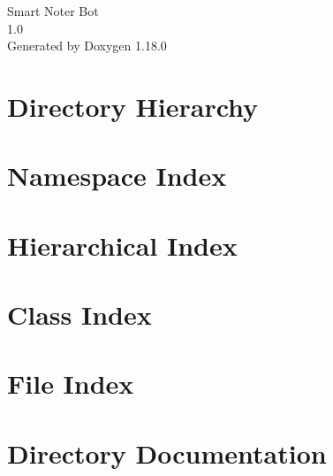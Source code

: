 \documentclass[twoside]{book}
\newcommand{\+}{\discretionary{\mbox{\scriptsize$\hookleftarrow$}}{}{}}
\newcommand{\clearemptydoublepage}{%
    \newpage{\pagestyle{empty}\cleardoublepage}%
  }
\begin{document}
  \raggedbottom
    \hypersetup{pageanchor=false,
                bookmarksnumbered=true,
                pdfencoding=unicode
               }
  \begin{titlepage}
  \vspace*{7cm}
  \begin{center}%
  {\Large Smart Noter Bot}\\
  [1ex]\large 1.\+0 \\
  \vspace*{1cm}
  {\large Generated by Doxygen 1.18.0}\\
  \end{center}
  \end{titlepage}
  \clearemptydoublepage
  \tableofcontents
  \clearemptydoublepage
  \hypersetup{pageanchor=true}

\chapter{Directory Hierarchy}

\chapter{Namespace Index}

\chapter{Hierarchical Index}

\chapter{Class Index}

\chapter{File Index}

\chapter{Directory Documentation}





\end{document}
